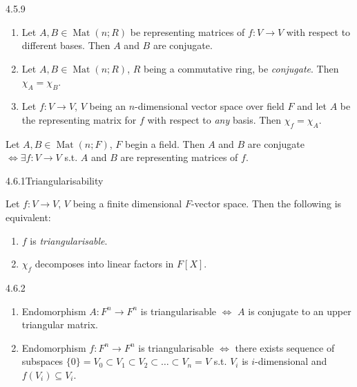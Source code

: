\documentclass[10pt]{article} %
\DeclareMathOperator{\Mat}{Mat}
\begin{document}
\begin{multicols}{3}
\begin{remark}{4.5.9}{}
    \begin{enumerate}
        \setlength{\parskip}{0em}
        \item [(2)] Let $A,B \in \Mat(n;R)$ be representing matrices of $f: V \to V$ with respect to different bases. Then $A$ and $B$ are conjugate.
        \item [(3)] Let $A,B \in \Mat(n;R)$, $R$ being a commutative ring, be \emph{conjugate}. Then $\chi_A = \chi_B$.
        \item [(4)] Let $f: V \to V$, $V$ being an $n$-dimensional vector space over field $F$ and let $A$ be the representing matrix for $f$ with respect to \emph{any} basis. Then $\chi_f = \chi_A$.
    \end{enumerate}

\end{remark}

\begin{exercise}{68}{}

    Let $A,B \in \Mat(n;F)$, $F$ begin a field. Then $A$ and $B$ are conjugate $\Leftrightarrow \exists f: V \to V$ s.t. $A$ and $B$ are representing matrices of $f$.

\end{exercise}

\begin{proposition}{4.6.1}{Triangularisability}

    Let $f: V \to V$, $V$ being a finite dimensional $F$-vector space. Then the following is equivalent:

        \begin{enumerate}[(1)]
            \setlength{\parskip}{0em}
            \item $f$ is \emph{triangularisable}.
            \item $\chi_f$ decomposes into linear factors in $F[X]$.
        \end{enumerate}

\end{proposition}

\begin{remark}{4.6.2}{}

    \begin{enumerate}
        \setlength{\parskip}{0em}
        \item [(1)] Endomorphism $A: F^n \to F^n$ is triangularisable $\Leftrightarrow$ $A$ is conjugate to an upper triangular matrix.
        \item [(3)] Endomorphism $f: F^n \to F^n$ is triangularisable $\Leftrightarrow$ there exists sequence of subspaces $\{ 0 \} = V_0 \subset V_1 \subset V_2 \subset \hdots \subset V_n = V$ s.t. $V_i$ is $i$-dimensional and $f(V_i) \subseteq V_i$.
    \end{enumerate}


\end{remark}
\end{multicols}
\end{document}
